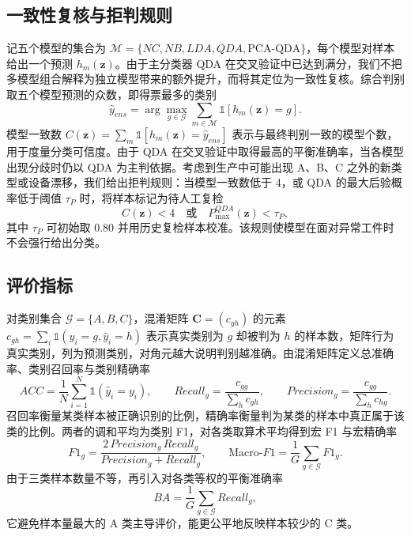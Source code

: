 \documentclass[12pt,a4paper]{article}
\begin{document}
\subsection{一致性复核与拒判规则}

记五个模型的集合为 $\mathcal{M}=\{NC,NB,LDA,QDA,\text{PCA-QDA}\}$，每个模型对样本给出一个预测 $h_m(\mathbf{z})$。由于主分类器 QDA 在交叉验证中已达到满分，我们不把多模型组合解释为独立模型带来的额外提升，而将其定位为一致性复核。综合判别取五个模型预测的众数，即得票最多的类别
\begin{equation}
\hat{y}_{ens}=\arg\max_{g\in\mathcal{G}}\sum_{m\in\mathcal{M}}\mathbb{1}[h_m(\mathbf{z})=g].
\end{equation}
模型一致数 $C(\mathbf{z})=\sum_{m}\mathbb{1}[h_m(\mathbf{z})=\hat{y}_{ens}]$ 表示与最终判别一致的模型个数，用于度量分类可信度。由于 QDA 在交叉验证中取得最高的平衡准确率，当各模型出现分歧时仍以 QDA 为主判依据。考虑到生产中可能出现 A、B、C 之外的新类型或设备漂移，我们给出拒判规则：当模型一致数低于 4，或 QDA 的最大后验概率低于阈值 $\tau_P$ 时，将样本标记为待人工复检
\begin{equation}
C(\mathbf{z})<4\quad\text{或}\quad P_{\max}^{QDA}(\mathbf{z})<\tau_P,
\end{equation}
其中 $\tau_P$ 可初始取 0.80 并用历史复检样本校准。该规则使模型在面对异常工件时不会强行给出分类。

\subsection{评价指标}

对类别集合 $\mathcal{G}=\{A,B,C\}$，混淆矩阵 $\mathbf{C}=(c_{gh})$ 的元素 $c_{gh}=\sum_{i}\mathbb{1}(y_i=g,\hat{y}_i=h)$ 表示真实类别为 $g$ 却被判为 $h$ 的样本数，矩阵行为真实类别，列为预测类别，对角元越大说明判别越准确。由混淆矩阵定义总准确率、类别召回率与类别精确率
\begin{equation}
ACC=\frac{1}{N}\sum_{i=1}^{N}\mathbb{1}(\hat{y}_i=y_i),\qquad
Recall_g=\frac{c_{gg}}{\sum_{h}c_{gh}},\qquad
Precision_g=\frac{c_{gg}}{\sum_{h}c_{hg}}.
\end{equation}
召回率衡量某类样本被正确识别的比例，精确率衡量判为某类的样本中真正属于该类的比例。两者的调和平均为类别 F1，对各类取算术平均得到宏 F1 与宏精确率
\begin{equation}
F1_g=\frac{2\,Precision_g\,Recall_g}{Precision_g+Recall_g},\qquad
\text{Macro-}F1=\frac{1}{G}\sum_{g\in\mathcal{G}}F1_g.
\end{equation}
由于三类样本数量不等，再引入对各类等权的平衡准确率
\begin{equation}
BA=\frac{1}{G}\sum_{g\in\mathcal{G}}Recall_g,
\end{equation}
它避免样本量最大的 A 类主导评价，能更公平地反映样本较少的 C 类。
\end{document}
